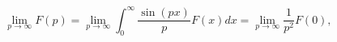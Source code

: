 \begin{equation}
\lim_{p\rightarrow\infty}F(p)=\lim_{p\rightarrow\infty}\int_{0}^{\infty}%
\frac{\sin(px)}{p}F(x)dx=\lim_{p\rightarrow\infty}\frac{1}{p^{2}}F(0),
\end{equation}

